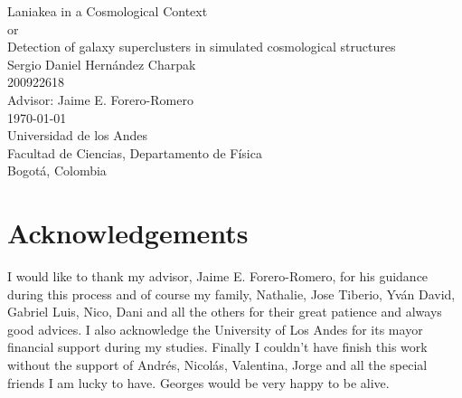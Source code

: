 \documentclass[12pt]{article}
\begin{document}
\begin{center}
\begin{figure}
\centering%
%
\end{figure}
\vspace{3 cm}
\FloatBarrier
\Huge
Laniakea in a Cosmological Context\\
\vspace{3 mm}
or\\
\vspace{3 mm}
Detection of galaxy superclusters in simulated cosmological structures\\  
\vspace{1 cm}
\vspace{3mm}
\Large Sergio Daniel Hern\'{a}ndez Charpak\\

\large
200922618\\
\vspace{1 cm}
\vspace{2mm}
\Large
Advisor: Jaime E. Forero-Romero\\

\normalsize
\vspace{2mm}
\vspace{1 cm}
\today \\
\vspace{1 cm}
\small 
Universidad de los Andes\\
Facultad de Ciencias, Departamento de F\'{i}sica\\
Bogot\'{a}, Colombia\\
\end{center}


\normalsize
\newpage
\section{Acknowledgements}

I would like to thank my advisor, Jaime E. Forero-Romero, for his guidance
 during this process and of course my family,
  Nathalie, Jose Tiberio, Yv\'{a}n David,
  Gabriel Luis, Nico, Dani and all the others for
   their great patience and always good advices. I
    also acknowledge the University of Los Andes
     for its mayor financial support during my
      studies. Finally I couldn't have finish this
       work without the support of Andr\'{e}s,
        Nicol\'{a}s, Valentina, Jorge and all the special
         friends I am lucky to have. Georges would
          be very happy to be alive.
\end{document}
